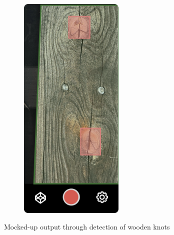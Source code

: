 \begin{figure}[ht]
\begin{subfigure}[b]{0.4\textwidth}
        \includegraphics[width=0.55\textwidth]{Master Thesis/Images/Section_3/Mock/3-Mock3.png}
    \end{subfigure}
  \caption{Mocked-up output through detection of wooden knots}   
    \label{fig:mock2}
\end{figure}  
